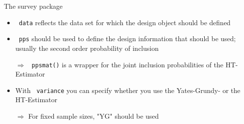 \documentclass[11pt,german,hideothersubsections]{beamer}
\newcommand{\R}[1]{{\tt \color{blue}  #1}}
\begin{document}
\begin{frame}[fragile]{The survey package}
\footnotesize{
\begin{Schunk}
\end{Schunk}
}
\begin{itemize}
\item \R{data} reflects the data set for which the design object should be defined
\item \R{pps} should be used to define the design information that should be used; usually the second order probability of inclusion
\item[$\Rightarrow$] \R{ppsmat()} is a wrapper for the joint inclusion probabilities of the HT-Estimator
\item With \R{variance} you can specify whether you use the Yates-Grundy- or the HT-Estimator
\item[$\Rightarrow$] For fixed sample sizes, "YG" should be used
\end{itemize}
\end{frame}
\end{document}

